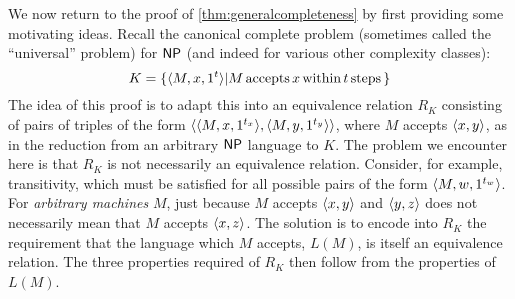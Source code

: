 We now return to the proof of \autoref{thm:generalcompleteness} by first providing some motivating ideas.
Recall the canonical complete problem (sometimes called the ``universal'' problem) for ${\mathsf{NP}}$ (and indeed for various other complexity classes):
\begin{displaymath}
  K = \{\langle M,x,1^t\rangle|M\,\text{accepts}\, x \,\text{within}\, t \,\text{steps}\,\}
\end{displaymath}
The idea of this proof is to adapt this into an equivalence relation $R_K$ consisting of pairs of triples of the form $\langle\langle M,x,1^{t_x}\rangle,\langle M,y,1^{t_y}\rangle\rangle$, where $M$ accepts $\langle x,y\rangle$, as in the reduction from an arbitrary ${\mathsf{NP}}$ language to $K$.
The problem we encounter here is that $R_K$ is not necessarily an equivalence relation.
Consider, for example, transitivity, which must be satisfied for all possible pairs of the form $\langle M,w,1^{t_w}\rangle$.
For \emph{arbitrary machines} $M$, just because $M$ accepts $\langle x,y\rangle$ and $\langle y,z\rangle$ does not necessarily mean that $M$ accepts $\langle x,z\rangle$.
The solution is to encode into $R_K$ the requirement that the language which $M$ accepts, $L(M)$, is itself an equivalence relation.
The three properties required of $R_K$ then follow from the properties of $L(M)$.
%
%
